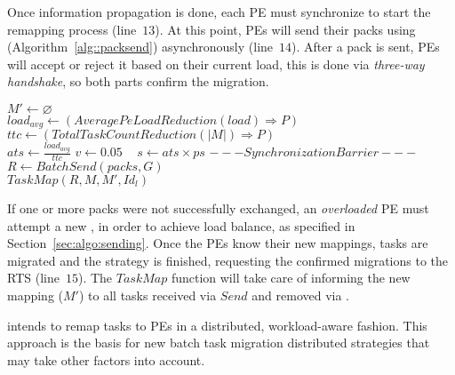 Once information propagation is done, each PE must synchronize to start the remapping process (line~$13$). 
At this point, PEs will send their packs using \batchsend (Algorithm~\ref{alg::packsend}) asynchronously (line~$14$).
After a pack is sent, PEs will accept or reject it based on their current load, this is done via \textit{three-way handshake}, so both parts confirm the migration.

\begin{algorithm}[t]
	\DontPrintSemicolon
    $  M' \gets \varnothing$\\
    $load_{avg} \gets (AveragePeLoadReduction(load)\Rightarrow  P)$ \\
    $ttc \gets (TotalTaskCountReduction(|M|)\Rightarrow  P)$\\
    $ats\gets \frac{load_{avg}}{ttc}$ \qquad\qquad\qquad {}
    $v \gets 0.05$ \qquad \qquad\ 
    $s \gets ats\times ps$ \qquad\qquad\qquad\qquad\qquad {}
    $---Synchronization Barrier---$\\
    $R \gets BatchSend(packs, G)$\\
    $TaskMap(R,M, M',Id_{l})$
    \caption{\packdrop}
    \label{alg::packdrop}    
\end{algorithm}

If one or more packs were not successfully exchanged, an \textit{overloaded} PE must attempt a new \batchsend, in order to achieve load balance, as specified in Section~\ref{sec:algo:sending}.
Once the PEs know their new mappings, tasks are migrated and the strategy is finished, requesting the confirmed migrations to the RTS (line~$15$). 
The $TaskMap$ function will take care of informing the new mapping ($M'$) to all tasks received via $Send$ and removed via \batchsend.

\packdrop intends to remap tasks to PEs in a distributed, workload-aware fashion.
This approach is the basis for new batch task migration distributed strategies that may take other factors into account.

